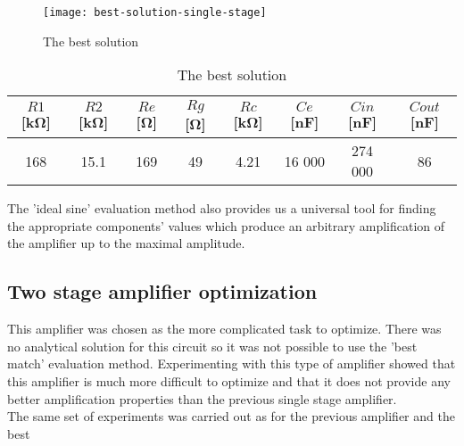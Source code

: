\begin{figure}[H]
    \centerline{\texttt{[image: best-solution-single-stage]}\label{better-solution-fig}}
    \caption{The best solution}
\end{figure}

\begin{table}[H]
\centering
\begin{tabular}{@{}cccccccc@{}}
\toprule
    $R1$ [\si{\kilo\ohm}] & $R2$ [\si{\kilo\ohm}] & $Re$ [\si{\ohm}] & $Rg$ [\si{\ohm}] & $Rc$ [\si{\kilo\ohm}] & $Ce$ [\si{\nano\farad}] & $Cin$ [\si{\nano\farad}] & $Cout$ [\si{\nano\farad}] \\
    \midrule
    168 & 15.1 & 169 & 49 & 4.21 & 16 000 & 274 000 & 86 \\
    \bottomrule
\end{tabular}
\caption{The best solution}
\label{better-solution-tab}
\end{table}

The 'ideal sine' evaluation method also provides us a universal tool for finding the appropriate components' values which produce an arbitrary amplification of the amplifier up to the maximal amplitude.

\subsection{Two stage amplifier optimization} \label{2stage-results}
This amplifier was chosen as the more complicated task to optimize. There was no analytical solution for this circuit so it was not possible to use the 'best match' evaluation method. Experimenting with this type of amplifier showed that this amplifier is much more difficult to optimize and that it does not provide any better amplification properties than the previous single stage amplifier.\\
The same set of experiments was carried out as for the previous amplifier and the best